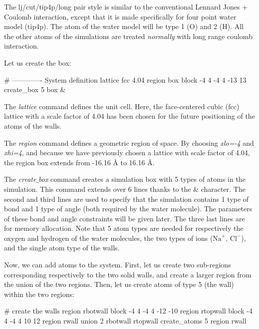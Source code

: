 \begin{tcolorbox}[colback=mylightblue!5!white,colframe=mylightblue!75!black,title=About lj/cut/tip4p/long pair style]
The lj/cut/tip4p/long pair style is similar to the conventional 
Lennard Jones + Coulomb interaction, except that it is made specifically 
for four point water model (tip4p). The atom of the water model
will be type 1 (O) and 2 (H). All the other atoms of the simulations 
are treated \textit{normally} with long range coulomb interaction.
\end{tcolorbox}

\noindent Let us create the box:

\begin{lcverbatim}
# ------------- System definition
lattice fcc 4.04
region box block -4 4 -4 4 -13 13
create_box 5 box &
\end{lcverbatim}

\noindent The \textit{lattice} command defines the unit
cell. Here, the face-centered cubic (fcc) lattice with a scale factor of
4.04 has been chosen for the future positioning of the atoms
of the walls.

The \textit{region} command defines a geometric
region of space. By choosing \textit{xlo=-4} and \textit{xhi=4}, and
because we have previously chosen a lattice with scale
factor of 4.04, the region box extends from -16.16 Å to 16.16 Å.

The \textit{create$\_$box} command creates a simulation box with 5 types of atoms in
the simulation. This command extends over 6 lines thanks to the
$\&$ character. The second and third lines are used to
specify that the simulation contains 1 type of bond and 1
type of angle (both required by the water molecule). The parameters of
these bond and angle constraints will be given later. The
three last lines are for memory allocation.
Note that 5 atom types are needed for respectively the oxygen and hydrogen
of the water molecules, the two types of ions ($\text{Na}^+$, $\text{Cl}^-$), and the
single atom type of the walls.

Now, we can add atoms to the system. First, let us create two
sub-regions corresponding respectively to the two solid
walls, and create a larger region from the union of the two
regions. Then, let us create atoms of type 5 (the wall) within the two
regions:

\begin{lcverbatim}
# create the walls
region rbotwall block -4 4 -4 4 -12 -10
region rtopwall block -4 4 -4 4 10 12
region rwall union 2 rbotwall rtopwall
create_atoms 5 region rwall
\end{lcverbatim}

